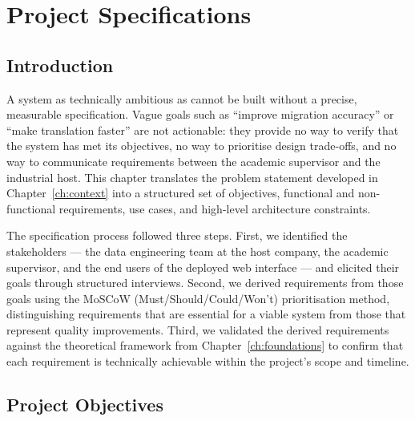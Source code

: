
\chapter{Project Specifications}
\label{ch:specifications}

\section{Introduction}
\label{sec:ch3-intro}

A system as technically ambitious as \codara{} cannot be built without a
precise, measurable specification. Vague goals such as ``improve migration
accuracy'' or ``make translation faster'' are not actionable: they provide no
way to verify that the system has met its objectives, no way to prioritise
design trade-offs, and no way to communicate requirements between the academic
supervisor and the industrial host. This chapter translates the problem
statement developed in Chapter~\ref{ch:context} into a structured set of
objectives, functional and non-functional requirements, use cases, and
high-level architecture constraints.

The specification process followed three steps. First, we identified the
stakeholders --- the data engineering team at the host company, the academic
supervisor, and the end users of the deployed web interface --- and elicited
their goals through structured interviews. Second, we derived requirements from
those goals using the MoSCoW (Must/Should/Could/Won't) prioritisation method,
distinguishing requirements that are essential for a viable system from those
that represent quality improvements. Third, we validated the derived requirements
against the theoretical framework from Chapter~\ref{ch:foundations} to confirm
that each requirement is technically achievable within the project's scope and
timeline.

\section{Project Objectives}
\label{sec:objectives}

